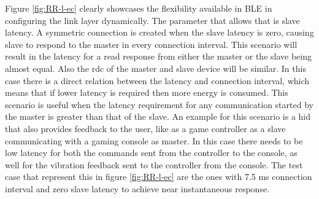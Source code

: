 Figure \ref{fig:RR-l-ec} clearly showcases the flexibility available in BLE in configuring the link layer dynamically. The parameter that allows that is slave latency. A symmetric connection is created when the slave latency is zero, causing slave to respond to the master in every connection interval. This scenario will result in the latency for a read response from either the master or the slave being almost equal. Also the \gls{rdc} of the master and slave device will be similar. In this case there is a direct relation between the latency and connection interval, which means that if lower latency is required then more energy is consumed. This scenario is useful when the latency requirement for any communication started by the master is greater than that of the slave. An example for this scenario is a \gls{hid} that also provides feedback to the user, like as a game controller as a slave communicating with a gaming console as master. In this case there needs to be low latency for both the commands sent from the controller to the console, as well for the vibration feedback sent to the controller from the console. The test case that represent this in figure \ref{fig:RR-l-ec} are the ones with 7.5 ms connection interval and zero slave latency to achieve near instantaneous response.

